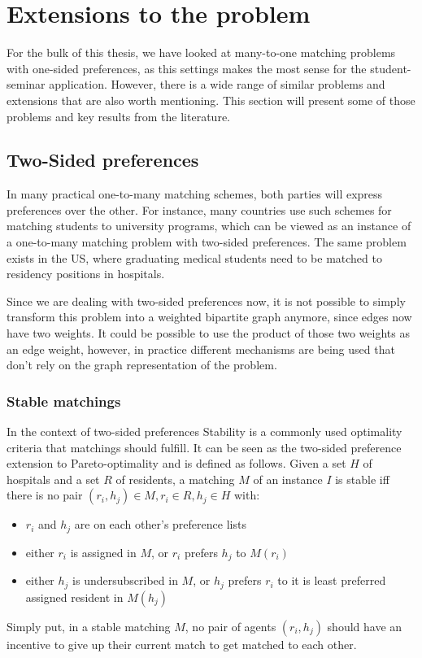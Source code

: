 \section{Extensions to the problem}
For the bulk of this thesis, we have looked at many-to-one matching problems with one-sided preferences, as this settings makes the most sense for the student-seminar application. However, there is a wide range of similar problems and extensions that are also worth mentioning. This section will present some of those problems and key results from the literature. 

\subsection{Two-Sided preferences}\label{extensions:two-sided}
In many practical one-to-many matching schemes, both parties will express preferences over the other. For instance, many countries use such schemes for matching students to university programs, which can be viewed as an instance of a one-to-many matching problem with two-sided preferences. The same problem exists in the US, where graduating medical students need to be matched to residency positions in hospitals. 

Since we are dealing with two-sided preferences now, it is not possible to simply transform this problem into a weighted bipartite graph anymore, since edges now have two weights. It could be possible to use the product of those two weights as an edge weight, however, in practice different mechanisms are being used that don't rely on the graph representation of the problem.

\subsubsection{Stable matchings}
In the context of two-sided preferences Stability is a commonly used optimality criteria that matchings should fulfill. It can be seen as the two-sided preference extension to Pareto-optimality and is defined as follows. Given a set $H$ of hospitals and a set $R$ of residents, a matching $M$ of an instance $I$ is stable iff there is no pair $(r_i, h_j) \in M, r_i \in R, h_j \in H$ with:
\begin{itemize}
    \item $r_i$ and $h_j$ are on each other's preference lists
    \item either $r_i$ is assigned in $M$, or $r_i$ prefers $h_j$ to $M(r_i)$
    \item either $h_j$ is undersubscribed in $M$, or $h_j$ prefers $r_i$ to it is least preferred assigned resident in $M(h_j)$
\end{itemize}
Simply put, in a stable matching $M$, no pair of agents $(r_i, h_j)$ should have an incentive to give up their current match to get matched to each other.

